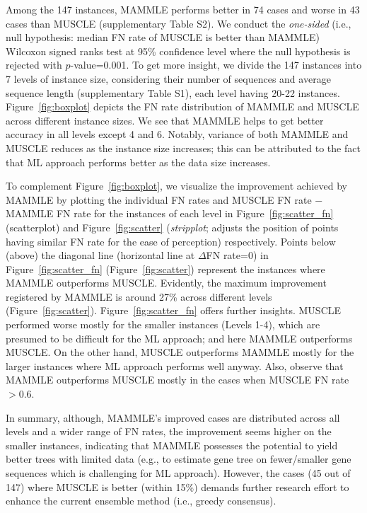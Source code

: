Among the 147 instances, MAMMLE performs better in 74 cases and worse in 43 cases than MUSCLE (supplementary Table S2). We conduct the \textit{one-sided} (i.e., null hypothesis: median FN rate of MUSCLE is better than MAMMLE) Wilcoxon signed ranks test at 95\% confidence level where the null hypothesis is rejected with $p$-value=0.001. To get more insight, we divide the 147 instances into 7 levels of instance size, considering their number of sequences and average sequence length (supplementary Table S1), each level having 20-22 instances. Figure~\ref{fig:boxplot} depicts the FN rate distribution of MAMMLE and MUSCLE across different instance sizes. We see that MAMMLE helps to get better accuracy in all levels except 4 and 6. Notably, variance of both MAMMLE and MUSCLE reduces as the instance size increases; this can be attributed to the fact that ML approach performs better as the data size increases. 

To complement Figure~\ref{fig:boxplot}, we visualize the improvement achieved by MAMMLE by plotting the individual FN rates and MUSCLE FN rate $-$ MAMMLE FN rate for the instances of each level in Figure~\ref{fig:scatter_fn} (scatterplot) and Figure~\ref{fig:scatter} (\textit{stripplot}; adjusts the position of points having similar FN rate for the ease of perception) respectively. Points below (above) the diagonal line (horizontal line at $\Delta$FN rate=0) in Figure~\ref{fig:scatter_fn} (Figure~\ref{fig:scatter}) represent the instances where MAMMLE outperforms MUSCLE. Evidently, the maximum improvement registered by MAMMLE is around 27\% across different levels (Figure~\ref{fig:scatter}). Figure~\ref{fig:scatter_fn} offers further insights. MUSCLE performed worse mostly for the smaller instances (Levels 1-4), which are presumed to be difficult for the ML approach; and here MAMMLE outperforms MUSCLE. On the other hand, MUSCLE outperforms MAMMLE mostly for the larger instances where ML approach performs well anyway. Also, observe that MAMMLE outperforms MUSCLE mostly in the cases when MUSCLE FN rate $> 0.6$. 

In summary, although, MAMMLE's improved cases are distributed across all levels and a wider range of FN rates, the improvement seems higher on the smaller instances, indicating that MAMMLE possesses the potential to yield better trees with limited data (e.g., to estimate gene tree on fewer/smaller gene sequences which is challenging for ML approach). 
However, the cases (45 out of 147) where MUSCLE is better (within 15\%) demands further research effort to enhance the current ensemble method (i.e., greedy consensus).

